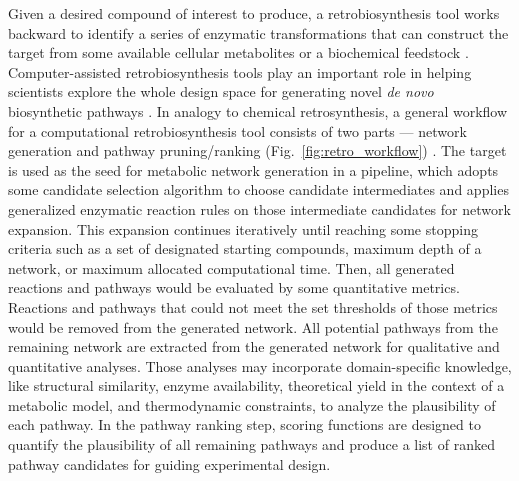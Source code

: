 \documentclass{article}
\begin{document}
Given a desired compound of interest to produce, a retrobiosynthesis tool works backward to identify a series of enzymatic transformations that can construct the target from some available cellular metabolites or a biochemical feedstock \citep{hadadi2015design, lin2019retrosynthetic}.  
Computer-assisted retrobiosynthesis tools play an important role in helping scientists explore the whole design space for generating novel \textit{de novo} biosynthetic pathways \citep{hadadi2015design}.
In analogy to chemical retrosynthesis, a general workflow for a computational retrobiosynthesis tool consists of two parts --- network generation and pathway pruning/ranking (Fig.~\ref{fig:retro_workflow}) \citep{yim2011metabolic, segler2018planning, hadadi2015design, wang2017review}. 
The target is used as the seed for metabolic network generation in a pipeline, which adopts some candidate selection algorithm to choose candidate intermediates and applies generalized enzymatic reaction rules on those intermediate candidates for network expansion. This expansion continues iteratively until reaching some stopping criteria such as a set of designated starting compounds, maximum depth of a network, or maximum allocated computational time. 
Then, all generated reactions and pathways would be evaluated by some quantitative metrics. Reactions and pathways that could not meet the set thresholds of those metrics would be removed from the generated network. 
All potential pathways from the remaining network are extracted from the generated network for qualitative and quantitative analyses. Those analyses may incorporate domain-specific knowledge, like structural similarity, enzyme availability, theoretical yield in the context of a metabolic model, and thermodynamic constraints, to analyze the plausibility of each pathway. 
In the pathway ranking step, scoring functions are designed to quantify the plausibility of all remaining pathways and produce a list of ranked pathway candidates for guiding experimental design.
\end{document}
